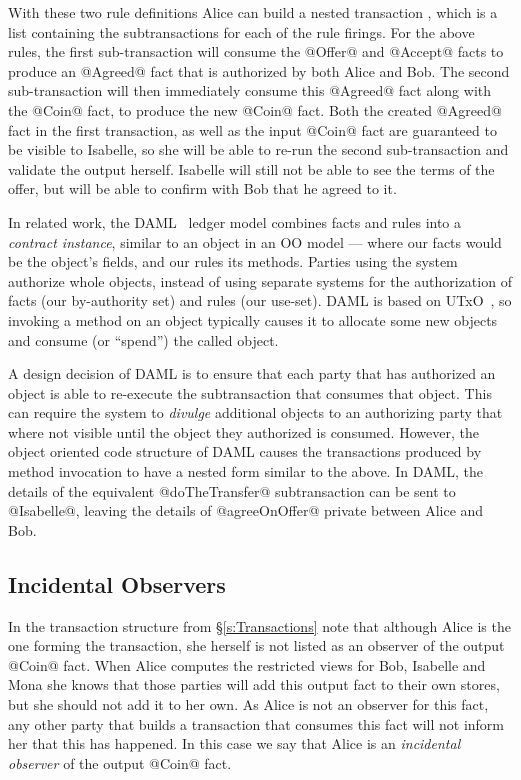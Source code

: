With these two rule definitions Alice can build a nested transaction \CITE, which is a list containing the subtransactions for each of the rule firings. For the above rules, the first sub-transaction will consume the @Offer@ and @Accept@ facts to produce an @Agreed@ fact that is authorized by both Alice and Bob. The second sub-transaction will then immediately consume this @Agreed@ fact along with the @Coin@ fact, to produce the new @Coin@ fact. Both the created @Agreed@ fact in the first transaction, as well as the input @Coin@ fact are guaranteed to be visible to Isabelle, so she will be able to re-run the second sub-transaction and validate the output herself. Isabelle will still not be able to see the terms of the offer, but will be able to confirm with Bob that he agreed to it.

In related work, the DAML~\cite{DA2019:DAML} ledger model combines facts and rules into a \emph{contract instance}, similar to an object in an OO model --- where our facts would be the object's fields, and our rules its methods. Parties using the system authorize whole objects, instead of using separate systems for the authorization of facts (our by-authority set) and rules (our use-set). DAML is based on UTxO~\cite{Zahnentferner2018:UTxO}, so invoking a method on an object typically causes it to allocate some new objects and consume (or ``spend'') the called object.

A design decision of DAML is to ensure that each party that has authorized an object is able to re-execute the subtransaction that consumes that object. This can require the system to \emph{divulge} additional objects to an authorizing party that where not visible until the object they authorized is consumed. However, the object oriented code structure of DAML causes the transactions produced by method invocation to have a nested form similar to the above. In DAML, the details of the equivalent @doTheTransfer@ subtransaction can be sent to @Isabelle@, leaving the details of @agreeOnOffer@ private between Alice and Bob.



\subsection{Incidental Observers}
In the transaction structure from \S\ref{s:Transactions} note that although Alice is the one forming the transaction, she herself is not listed as an observer of the output @Coin@ fact. When Alice computes the restricted views for Bob, Isabelle and Mona she knows that those parties will add this output fact to their own stores, but she should not add it to her own. As Alice is not an observer for this fact, any other party that builds a transaction that consumes this fact will not inform her that this has happened. In this case we say that Alice is an \emph{incidental observer} of the output @Coin@ fact.

